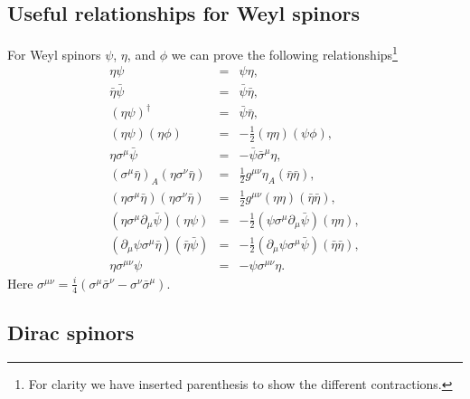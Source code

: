 \documentclass[notes.tex]{subfiles}
\begin{document}
\subsection{Useful relationships for Weyl spinors}
\label{sec:Weylspinor_calc}
For Weyl spinors $\psi$, $\eta$, and $\phi$ we can prove the following relationships\footnote{For clarity we have inserted parenthesis to show the different contractions.} 
\begin{eqnarray}
\eta\psi 				&=& \psi\eta,  \label{eq:Weylspinor_etapsi}  \\
\bar\eta\bar\psi 			&=& \bar\psi\bar\eta,  \\
(\eta\psi)^\dagger 		&=& \bar\psi\bar\eta,  \\
(\eta\psi)(\eta\phi) 		&=& -\frac{1}{2}(\eta\eta)(\psi\phi), \label{eq:Weylspinor_etapsietapsi}  \\
\eta\sigma^\mu\bar\psi 	&=& - \bar\psi\bar\sigma^\mu\eta,  \label{eq:Weylspinor_etasigmapsi} \\
(\sigma^\mu \bar{\eta})_A(\eta\sigma^\nu \bar{\eta})&=&\frac{1}{2}g^{\mu\nu}\eta_A(\bar{\eta}\bar{\eta}), \label{eq:Weylspinor_sigmaetaetasigmaeta}\\
(\eta\sigma^\mu \bar{\eta})(\eta\sigma^\nu \bar{\eta})&=&\frac{1}{2}g^{\mu\nu}(\eta\eta)(\bar{\eta}\bar{\eta}),   \label{eq:Weylspinor_etasigmamuetaetasigmanueta} \\
(\eta\sigma^\mu\partial_\mu \bar\psi )(\eta\psi) &=& -\frac{1}{2}(\psi\sigma^\mu\partial_\mu \bar\psi)(\eta\eta),\\
(\partial_\mu\psi\sigma^\mu \bar\eta)(\bar\eta\bar\psi) &=& -\frac{1}{2}(\partial_\mu\psi\sigma^\mu \bar\psi)(\bar\eta\bar\eta), \label{eq:Weylspinor_last} \\
\eta\sigma^{\mu\nu}\psi	&=&-\psi\sigma^{\mu\nu}\eta.   \label{eq:Weylspinor_etasigmamunupsi} 
\end{eqnarray}
Here $\sigma^{\mu\nu} = \frac{i}{4}(\sigma^\mu \bar{\sigma}^\nu - \sigma^\nu \bar{\sigma}^\mu)$.


\subsection{Dirac spinors}
\label{sec:Dirac_spinors}
\end{document}
